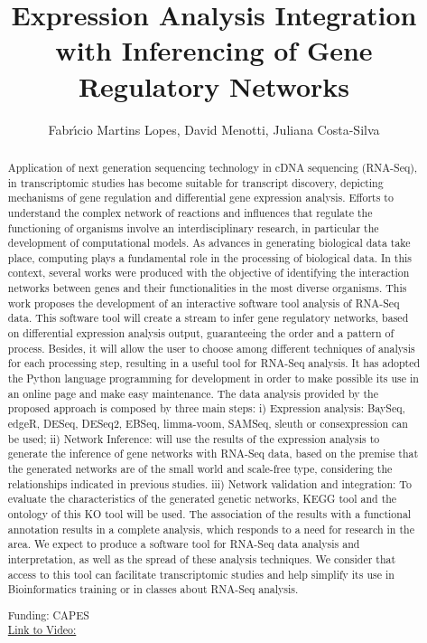 \documentclass[twoside]{article}
\title{\vspace{-15mm}\fontsize{24pt}{10pt}\selectfont\textbf{ Expression Analysis Integration with Inferencing of Gene Regulatory Networks }} %
\author{ Fabr\'{\i}cio Martins Lopes,  David Menotti,  Juliana Costa-Silva }
\affil{ UNIVERSIDADE FEDERAL DO PARAN\'A,  Universidade Tecnol\'ogica Federal do Paran\'a (UTFPR) }
\date{}
\begin{document}
  
  
  \maketitle %
  
  
  \thispagestyle{fancy} %
  
  
  \begin{abstract}
  Application of next generation sequencing technology in cDNA sequencing (RNA-Seq),  in transcriptomic studies has become suitable for transcript discovery,  depicting mechanisms of gene regulation and differential gene expression analysis. Efforts to understand the complex network of reactions and influences that regulate the functioning of organisms involve an interdisciplinary research,  in particular the development of computational models. As advances in generating biological data take place,  computing plays a fundamental role in the processing of biological data. In this context,  several works were produced with the objective of identifying the interaction networks between genes and their functionalities in the most diverse organisms.
This work proposes the development of an interactive software tool analysis of RNA-Seq data. This software tool will create a stream to infer gene regulatory networks,  based on differential expression analysis output,  guaranteeing the order and a pattern of process. Besides,  it will allow the user to choose among different techniques of analysis for each processing step,  resulting in a useful tool for RNA-Seq analysis. It has adopted the Python language programming for development in order to make possible its use in an online page and make easy maintenance. The data analysis provided by the proposed approach is composed by three main steps: i) Expression analysis: BaySeq,  edgeR,  DESeq,  DESeq2,  EBSeq,  limma-voom,  SAMSeq,  sleuth or consexpression can be used; ii) Network Inference: will use the results of the expression analysis to generate the inference of gene networks with RNA-Seq data,  based on the premise that the generated networks are of the small world and scale-free type,  considering the relationships indicated in previous studies. iii) Network validation and integration: To evaluate the characteristics of the generated genetic networks,  KEGG tool and the ontology of this KO tool will be used. The association of the results with a functional annotation results in a complete analysis,  which responds to a need for research in the area.
We expect to produce a software tool for RNA-Seq data analysis and interpretation,  as well as the spread of these analysis techniques. We consider that access to this tool can facilitate transcriptomic studies and help simplify its use in Bioinformatics training or in classes about RNA-Seq analysis.
  
  Funding: CAPES \\
  \href{http://ab3c.org.br/xpress_pres2020/xmxp2020-303167.html}{Link to Video:}

  \end{abstract}
   
  
\end{document}
